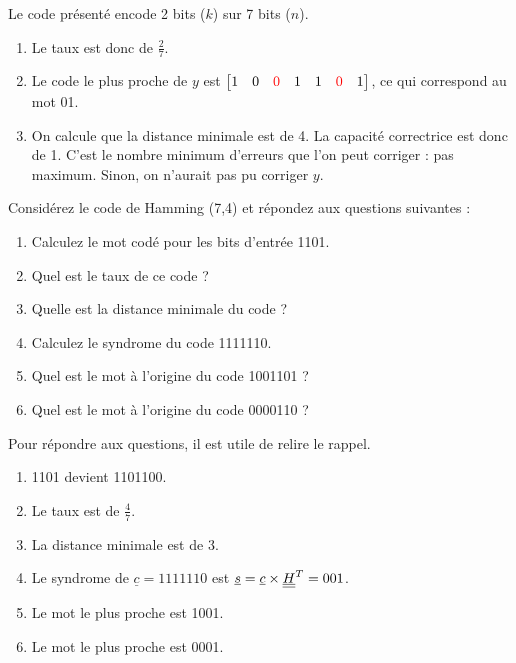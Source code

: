 \documentclass [a4paper, 11pt] {article}
\begin{document}
    \begin{reponse}
        Le code présenté encode 2 bits ($k$) sur 7 bits ($n$).
        
        \begin{enumerate}
            \item Le taux est donc de $\frac{2}{7}$.
            \item Le code le plus proche de $y$ est $\begin{bmatrix}
               1 & 0 & \color{red} 0 & 1 & 1 & \color{red} 0 & 1
            \end{bmatrix}$, ce qui correspond au mot 01.
            \item On calcule que la distance minimale est de 4. La capacité correctrice est donc de 1. C'est le nombre minimum d'erreurs que l'on peut corriger : pas maximum. Sinon, on n'aurait pas pu corriger $y$.
        \end{enumerate}
    \end{reponse}
    
    \begin{exercice}{2}
        
        Considérez le code de Hamming (7,4) et répondez aux questions suivantes :
      
        \begin{enumerate}
            \item Calculez le mot codé pour les bits d'entrée 1101.
            \item Quel est le taux de ce code ?
            \item Quelle est la distance minimale du code ?
            \item Calculez le syndrome du code 1111110.
            \item Quel est le mot à l'origine du code 1001101 ?
            \item Quel est le mot à l'origine du code 0000110 ?
        \end{enumerate} 
    \end{exercice}
    
    \begin{reponse}
        Pour répondre aux questions, il est utile de relire le rappel.
        \begin{enumerate}
            \item 1101 devient 1101100.
            \item Le taux est de $\frac{4}{7}$.
            \item La distance minimale est de 3.
            \item Le syndrome de $\underline{c}=1111110$ est $\underline{s} = \underline{c} \times \underline{\underline{H}}^T=001$.
            \item Le mot le plus proche est 1001.
            \item Le mot le plus proche est 0001.
        \end{enumerate}
    \end{reponse}
    
\end{document}
